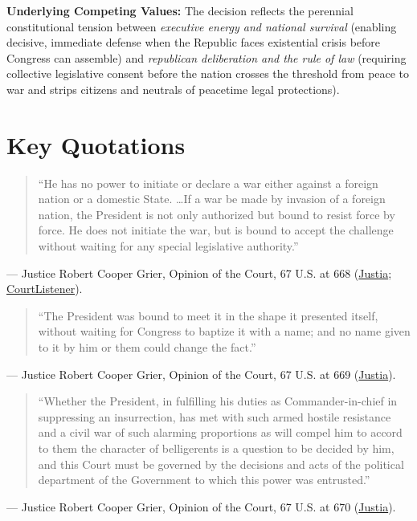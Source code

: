 \documentclass[12pt]{article}
\begin{document}
\textbf{Underlying Competing Values:} The decision reflects the perennial constitutional tension between \textit{executive energy and national survival} (enabling decisive, immediate defense when the Republic faces existential crisis before Congress can assemble) and \textit{republican deliberation and the rule of law} (requiring collective legislative consent before the nation crosses the threshold from peace to war and strips citizens and neutrals of peacetime legal protections).

\section{Key Quotations}

\begin{quote}
``He has no power to initiate or declare a war either against a foreign nation or a domestic State. \ldots If a war be made by invasion of a foreign nation, the President is not only authorized but bound to resist force by force. He does not initiate the war, but is bound to accept the challenge without waiting for any special legislative authority.''
\end{quote}
\noindent --- Justice Robert Cooper Grier, Opinion of the Court, 67 U.S. at 668 (\href{https://supreme.justia.com/cases/federal/us/67/635/}{Justia}; \href{https://www.courtlistener.com/opinion/87541/the-brig-amy-warwick/}{CourtListener}).

\begin{quote}
``The President was bound to meet it in the shape it presented itself, without waiting for Congress to baptize it with a name; and no name given to it by him or them could change the fact.''
\end{quote}
\noindent --- Justice Robert Cooper Grier, Opinion of the Court, 67 U.S. at 669 (\href{https://supreme.justia.com/cases/federal/us/67/635/}{Justia}).

\begin{quote}
``Whether the President, in fulfilling his duties as Commander-in-chief in suppressing an insurrection, has met with such armed hostile resistance and a civil war of such alarming proportions as will compel him to accord to them the character of belligerents is a question to be decided by him, and this Court must be governed by the decisions and acts of the political department of the Government to which this power was entrusted.''
\end{quote}
\noindent --- Justice Robert Cooper Grier, Opinion of the Court, 67 U.S. at 670 (\href{https://supreme.justia.com/cases/federal/us/67/635/}{Justia}).
\end{document}
